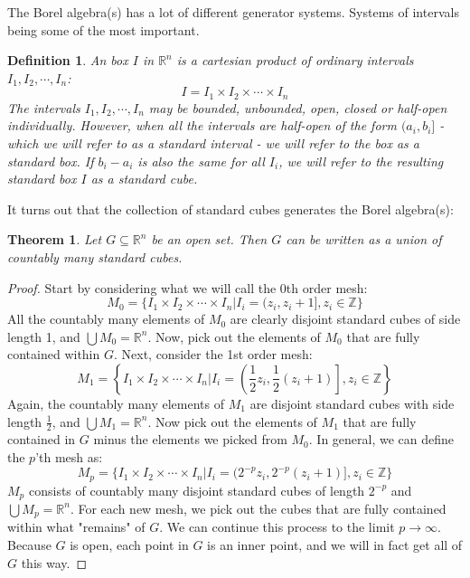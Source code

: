 \documentclass[12pt, a4paper]{article}
\newtheorem{theorem}{Theorem}[section]
\newtheorem{definition}{Definition}[section]
\numberwithin{equation}{section}
\begin{document}
The Borel algebra(s) has a lot of different generator systems. Systems of intervals being some of the most important.

\begin{definition}
\label{interval_def}
An box $I$ in $\mathbb{R}^n$ is a cartesian product of ordinary intervals $I_1, I_2,\cdots, I_n$:
\begin{equation}
I=I_1\times I_2\times\cdots\times I_n
\end{equation}
The intervals $I_1, I_2,\cdots, I_n$ may be bounded, unbounded, open, closed or half-open individually. However, when all the intervals are half-open of the form $(a_i,b_i]$ - which we will refer to as a standard interval - we will refer to the box as a standard box. If $b_i-a_i$ is also the same for all $I_i$, we will refer to the resulting standard box $I$ as a standard cube.
\end{definition}

It turns out that the collection of standard cubes generates the Borel algebra(s):

\begin{theorem}
\label{openset_countable}
Let $G\subseteq\mathbb{R}^n$ be an open set. Then $G$ can be written as a union of countably many standard cubes.
\end{theorem}
\begin{proof}
Start by considering what we will call the 0th order mesh:
\begin{equation}
M_0=\{I_1\times I_2\times\cdots\times I_n|I_i=(z_i,z_i+1], z_i\in\mathbb{Z}\}
\end{equation}
All the countably many elements of $M_0$ are clearly disjoint standard cubes of side length 1, and $\bigcup M_0=\mathbb{R}^n$. Now, pick out the elements of $M_0$ that are fully contained within $G$. Next, consider the 1st order mesh:
\begin{equation}
M_1=\left\{I_1\times I_2\times\cdots\times I_n|I_i=\left(\frac{1}{2}z_i,\frac{1}{2}(z_i+1)\right], z_i\in\mathbb{Z}\right\}
\end{equation}
Again, the countably many elements of $M_1$ are disjoint standard cubes with side length $\frac{1}{2}$, and $\bigcup M_1=\mathbb{R}^n$. Now pick out the elements of $M_1$ that are fully contained in $G$ minus the elements we picked from $M_0$. In general, we can define the $p$'th mesh as:
\begin{equation}
M_p=\{I_1\times I_2\times\cdots\times I_n|I_i=(2^{-p}z_i,2^{-p}(z_i+1)], z_i\in\mathbb{Z}\}
\end{equation}
$M_p$ consists of countably many disjoint standard cubes of length $2^{-p}$ and $\bigcup M_p=\mathbb{R}^n$. For each new mesh, we pick out the cubes that are fully contained within what "remains" of $G$. We can continue this process to the limit $p\rightarrow\infty$. Because $G$ is open, each point in $G$ is an inner point, and we will in fact get all of $G$ this way.
\end{proof}
\end{document}

